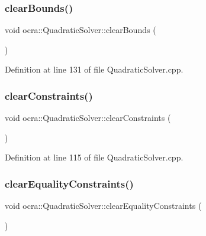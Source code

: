 \hypertarget{classocra_1_1QuadraticSolver_ab95c9570c859ca0d1ff2ea5f1c6efd44}{}\label{classocra_1_1QuadraticSolver_ab95c9570c859ca0d1ff2ea5f1c6efd44} 
\subsubsection{\texorpdfstring{clear\+Bounds()}{clearBounds()}}
{\footnotesize\ttfamily void ocra\+::\+Quadratic\+Solver\+::clear\+Bounds (\begin{DoxyParamCaption}{ }\end{DoxyParamCaption})}



Definition at line 131 of file Quadratic\+Solver.\+cpp.

\hypertarget{classocra_1_1QuadraticSolver_a0799e2cf2d10be123e5dcdf43e1fcaba}{}\label{classocra_1_1QuadraticSolver_a0799e2cf2d10be123e5dcdf43e1fcaba} 
\subsubsection{\texorpdfstring{clear\+Constraints()}{clearConstraints()}}
{\footnotesize\ttfamily void ocra\+::\+Quadratic\+Solver\+::clear\+Constraints (\begin{DoxyParamCaption}{ }\end{DoxyParamCaption})}



Definition at line 115 of file Quadratic\+Solver.\+cpp.

\hypertarget{classocra_1_1QuadraticSolver_a5e9a6e51657e775ab6619e86814982cc}{}\label{classocra_1_1QuadraticSolver_a5e9a6e51657e775ab6619e86814982cc} 
\subsubsection{\texorpdfstring{clear\+Equality\+Constraints()}{clearEqualityConstraints()}}
{\footnotesize\ttfamily void ocra\+::\+Quadratic\+Solver\+::clear\+Equality\+Constraints (\begin{DoxyParamCaption}{ }\end{DoxyParamCaption})}



